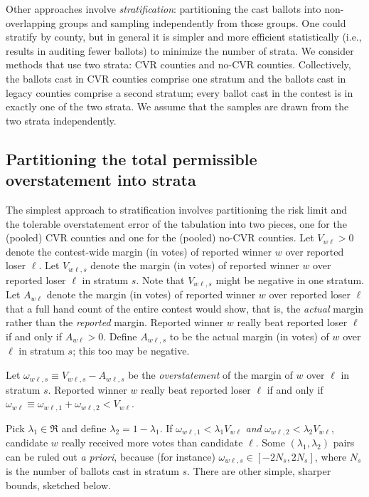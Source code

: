 \documentclass[12pt]{article}
\begin{document}
Other approaches involve \emph{stratification}: partitioning the cast ballots
into non-overlapping groups and sampling independently from those groups.
One could stratify by county, but in general it is simpler and more efficient
statistically (i.e., results in auditing fewer ballots) to minimize the number of strata.
We consider methods that use two strata: CVR counties and no-CVR counties. 
Collectively, the ballots cast in CVR counties comprise one stratum and the ballots cast in 
legacy counties comprise a second stratum; every ballot cast in the contest is in 
exactly one of the two strata. 
We assume that the samples are drawn from the
two strata independently.

\subsection{Partitioning the total permissible overstatement into strata}
The simplest approach to stratification involves partitioning the risk limit and the tolerable
overstatement error of the tabulation into
two pieces, one for the (pooled) CVR counties and one for the (pooled) no-CVR counties.
Let $V_{w\ell} > 0$ denote the contest-wide margin (in votes) of reported winner 
$w$ over reported loser
$\ell$.
Let $V_{w\ell,s}$ denote the margin (in votes) of reported winner $w$ over reported loser $\ell$
in stratum $s$. 
Note that $V_{w\ell,s}$ might be negative in one stratum.
Let $A_{w\ell}$ denote the margin (in votes)
of reported winner $w$ over reported loser $\ell$ that 
a full hand count of the entire contest would show, that is, the \emph{actual} margin rather
than the \emph{reported} margin.
Reported winner $w$ really beat reported loser $\ell$ if and only if $A_{w\ell} > 0$.
Define $A_{w\ell,s}$ to be the actual margin (in votes) of $w$ over $\ell$ in stratum $s$;
this too may be negative.

Let $\omega_{w\ell,s} \equiv V_{w\ell,s} - A_{w\ell,s}$ be the \emph{overstatement}
of the margin of $w$ over $\ell$ in stratum $s$.
Reported winner $w$ really beat reported loser 
$\ell$ if and only if $\omega_{w\ell} \equiv \omega_{w\ell,1} + \omega_{w\ell,2} < V_{w\ell}$.

Pick $\lambda_1 \in \Re$ and define $\lambda_2 = 1-\lambda_1$.
If $\omega_{w\ell,1} < \lambda_1 V_{w\ell}$ \emph{and} 
$\omega_{w\ell,2} < \lambda_2 V_{w\ell}$, candidate $w$ really received more votes
than candidate $\ell$.
Some $(\lambda_1, \lambda_2)$ pairs 
can be ruled out \emph{a priori}, because (for instance) $\omega_{w\ell,s} \in [-2N_s, 2N_s]$,
where $N_s$ is the number of ballots cast in stratum $s$.
There are other simple, sharper bounds, sketched below.
\end{document}
